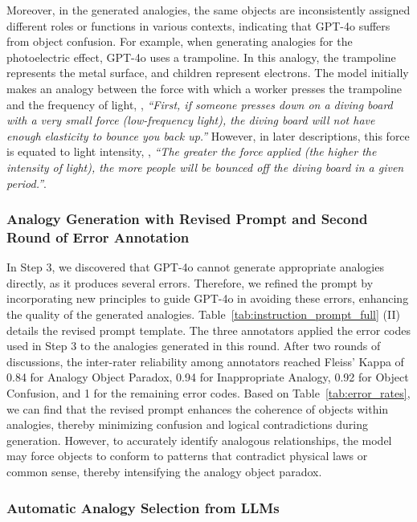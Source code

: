 Moreover, in the generated analogies, the same objects are inconsistently assigned different roles or functions in various contexts, indicating that GPT-4o suffers from object confusion.
For example, when generating analogies for the photoelectric effect, GPT-4o uses a trampoline. 
In this analogy, the trampoline represents the metal surface, and children represent electrons. 
The model initially makes an analogy between the force with which a worker presses the trampoline and the frequency of light, \eg, \textit{``First, if someone presses down on a diving board with a very small force (low-frequency light), the diving board will not have enough elasticity to bounce you back up.''}
However, in later descriptions, this force is equated to light intensity, \eg, \textit{``The greater the force applied (the higher the intensity of light), the more people will be bounced off the diving board in a given period.''}.


\subsubsection{Analogy Generation with Revised Prompt and Second Round of Error Annotation}
In Step 3, we discovered that GPT-4o cannot generate appropriate analogies directly, as it produces several errors. 
Therefore, we refined the prompt by incorporating new principles to guide GPT-4o in avoiding these errors, enhancing the quality of the generated analogies. 
Table~\ref{tab:instruction_prompt_full} (II) details the revised prompt template.
The three annotators applied the error codes used in Step 3 to the analogies generated in this round.
After two rounds of discussions, the inter-rater reliability among annotators reached Fleiss' Kappa of 0.84 for Analogy Object Paradox, 0.94 for Inappropriate Analogy, 0.92 for Object Confusion, and 1 for the remaining error codes.
Based on Table~\ref{tab:error_rates}, we can find that the revised prompt enhances the coherence of objects within analogies, thereby minimizing confusion and logical contradictions during generation. 
However, to accurately identify analogous relationships, the model may force objects to conform to patterns that contradict physical laws or common sense, thereby intensifying the analogy object paradox.

\subsubsection{Automatic Analogy Selection from LLMs}

